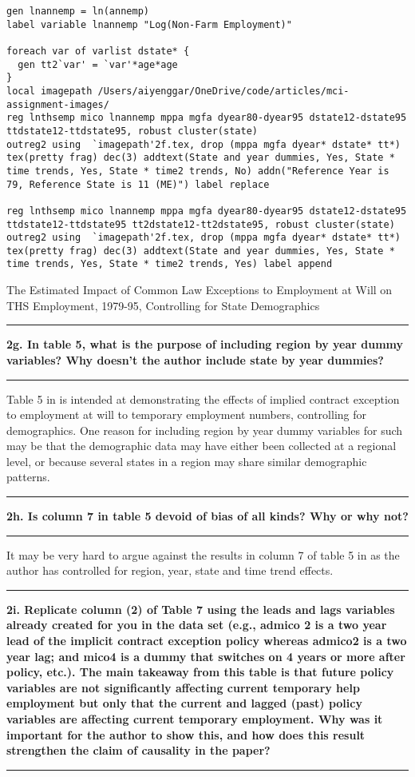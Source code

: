 \documentclass[12pt]{article}
\newcommand\question[1]{\vspace{1em}\hrule\vspace{1em}\textbf{#1}\vspace{1em}\hrule\vspace{1em}}
\begin{document}
\begin{lstlisting}
gen lnannemp = ln(annemp)
label variable lnannemp "Log(Non-Farm Employment)"

foreach var of varlist dstate* {
  gen tt2`var' = `var'*age*age
}
local imagepath /Users/aiyenggar/OneDrive/code/articles/mci-assignment-images/
reg lnthsemp mico lnannemp mppa mgfa dyear80-dyear95 dstate12-dstate95 ttdstate12-ttdstate95, robust cluster(state)
outreg2 using  `imagepath'2f.tex, drop (mppa mgfa dyear* dstate* tt*) tex(pretty frag) dec(3) addtext(State and year dummies, Yes, State * time trends, Yes, State * time2 trends, No) addn("Reference Year is 79, Reference State is 11 (ME)") label replace

reg lnthsemp mico lnannemp mppa mgfa dyear80-dyear95 dstate12-dstate95 ttdstate12-ttdstate95 tt2dstate12-tt2dstate95, robust cluster(state)
outreg2 using  `imagepath'2f.tex, drop (mppa mgfa dyear* dstate* tt*) tex(pretty frag) dec(3) addtext(State and year dummies, Yes, State * time trends, Yes, State * time2 trends, Yes) label append
\end{lstlisting}

\begin{table}
\caption{The Estimated Impact of Common Law Exceptions to Employment at Will on THS Employment, 1979-95, Controlling for State Demographics}

\label{2f}
\end{table}

\newpage
\question{2g. In table 5, what is the purpose of including region by year dummy variables? Why doesn't the author include state by year dummies? }
\noindent Table 5 in \cite{Autor2003} is intended at demonstrating the effects of implied contract exception to employment at will to temporary employment numbers, controlling for demographics. One reason for including region by year dummy variables for such may be that the demographic data may have either been collected at a regional level, or because several states in a region may share similar demographic patterns.  

\newpage
\question{2h. Is column 7 in table 5 devoid of bias of all kinds? Why or why not? }
\noindent It may be very hard to argue against the results in column 7 of table 5 in \cite{Autor2003} as the author has controlled for region, year, state and time trend effects. 

\newpage
\question{2i. Replicate column (2) of Table 7 using the leads and lags variables already created for you in the data set (e.g., admico 2 is a two year lead of the implicit contract exception policy whereas admico2 is a two year lag; and mico4 is a dummy that switches on 4 years or more after policy, etc.). The main takeaway from this table is that future policy variables are not significantly affecting current temporary help employment but only that the current and lagged (past) policy variables are affecting current temporary employment. Why was it important for the author to show this, and how does this result strengthen the claim of causality in the paper?}
\end{document}
